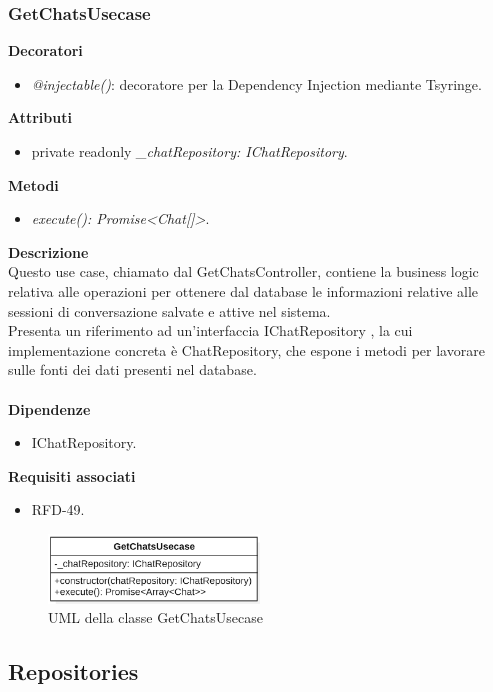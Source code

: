 \subsubsection{GetChatsUsecase}
\textbf{Decoratori}
\begin{itemize}
    \item \textit{@injectable()}: decoratore per la Dependency Injection mediante Tsyringe.
\end{itemize}
\textbf{Attributi}
\begin{itemize}
    \item private readonly \textit{\_chatRepository: IChatRepository}.
\end{itemize}
\textbf{Metodi}
\begin{itemize}
    \item \textit{execute(): Promise<Chat[]>}.
\end{itemize}
\textbf{Descrizione}\\
Questo use case, chiamato dal GetChatsController, contiene la business logic relativa alle operazioni per ottenere dal database le informazioni relative alle sessioni di conversazione salvate e attive nel sistema.\\
Presenta un riferimento ad un'interfaccia IChatRepository , la cui implementazione concreta è ChatRepository, che espone i metodi per lavorare sulle fonti dei dati presenti nel database.\\ \\
\textbf{Dipendenze}
\begin{itemize}
    \item IChatRepository.
\end{itemize}
\textbf{Requisiti associati}
\begin{itemize}
    \item RFD-49.
\end{itemize}

\begin{figure}[h!]
    \centering  
    \includegraphics[width=0.5\textwidth]{GetChatsUsecase.png}
    \caption{UML della classe GetChatsUsecase}
\end{figure}

\subsection{Repositories} \label{subsec:repositories}
